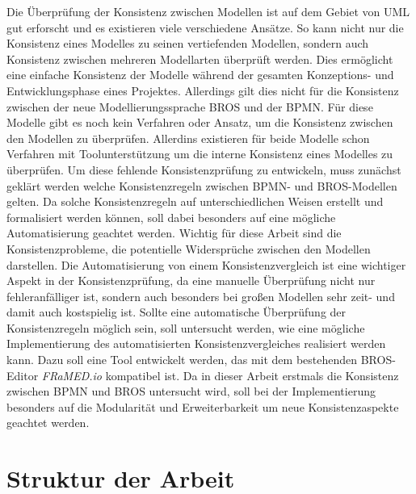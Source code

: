 Die Überprüfung der Konsistenz zwischen Modellen ist auf dem Gebiet von UML gut erforscht und es existieren viele verschiedene Ansätze.
So kann nicht nur die Konsistenz eines Modelles zu seinen vertiefenden Modellen, sondern auch Konsistenz zwischen mehreren Modellarten überprüft werden.
Dies ermöglicht eine einfache Konsistenz der Modelle während der gesamten Konzeptions- und Entwicklungsphase eines Projektes. 
Allerdings gilt dies nicht für die Konsistenz zwischen der neue Modellierungssprache BROS und der BPMN.
Für diese Modelle gibt es noch kein Verfahren oder Ansatz, um die Konsistenz zwischen den Modellen zu überprüfen.
Allerdins existieren für beide Modelle schon Verfahren mit Toolunterstützung um die interne Konsistenz eines Modelles zu überprüfen.
Um diese fehlende Konsistenzprüfung zu entwickeln, muss zunächst geklärt werden welche Konsistenzregeln zwischen BPMN- und BROS-Modellen gelten.
Da solche Konsistenzregeln auf unterschiedlichen Weisen erstellt und formalisiert werden können, soll dabei besonders auf eine mögliche Automatisierung geachtet werden.
Wichtig für diese Arbeit sind die Konsistenzprobleme, die potentielle Widersprüche zwischen den Modellen darstellen. 
Die Automatisierung von einem Konsistenzvergleich ist eine wichtiger Aspekt in der Konsistenzprüfung, da eine manuelle Überprüfung nicht nur fehleranfälliger ist, sondern auch besonders bei großen Modellen sehr zeit- und damit auch kostspielig ist.
Sollte eine automatische Überprüfung der Konsistenzregeln möglich sein, soll untersucht werden, wie eine mögliche Implementierung des automatisierten Konsistenzvergleiches realisiert werden kann.
Dazu soll eine Tool entwickelt werden, das mit dem bestehenden BROS-Editor \emph{FRaMED.io} kompatibel ist.
Da in dieser Arbeit erstmals die Konsistenz zwischen BPMN und BROS untersucht wird, soll bei der Implementierung besonders auf die Modularität und Erweiterbarkeit um neue Konsistenzaspekte geachtet werden.

\section{Struktur der Arbeit}

